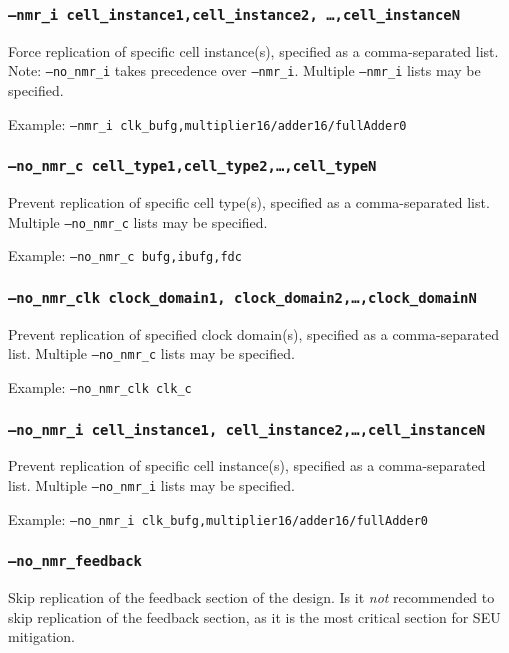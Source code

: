 \subsubsection{\texttt{--nmr\_i cell\_instance1,cell\_instance2,
\ldots,cell\_instanceN}}
Force replication of specific cell instance(s), specified as a comma-separated
list. 
Note: \texttt{--no\_nmr\_i} takes precedence over \texttt{--nmr\_i}. Multiple
\texttt{--nmr\_i} lists may be specified.
 
Example: \texttt{--nmr\_i clk\_bufg,multiplier16/adder16/fullAdder0}

\subsubsection{\texttt{--no\_nmr\_c cell\_type1,cell\_type2,\ldots,cell\_typeN}}
Prevent replication of specific cell type(s), specified as a comma-separated 
list. Multiple \texttt{--no\_nmr\_c} lists may be specified.

Example: \texttt{--no\_nmr\_c bufg,ibufg,fdc}

\subsubsection{\texttt{--no\_nmr\_clk clock\_domain1,
clock\_domain2,\ldots,clock\_domainN}}
Prevent replication of specified clock domain(s), specified as a comma-separated 
list. Multiple \texttt{--no\_nmr\_c} lists may be specified.

Example: \texttt{--no\_nmr\_clk clk\_c}


\subsubsection{\texttt{--no\_nmr\_i cell\_instance1,
cell\_instance2,\ldots,cell\_instanceN}}
Prevent replication of specific cell instance(s), specified as a 
comma-separated list. Multiple \texttt{--no\_nmr\_i} lists may be
specified.

Example: \texttt{--no\_nmr\_i clk\_bufg,multiplier16/adder16/fullAdder0}

\subsubsection{\texttt{--no\_nmr\_feedback}}
Skip replication of the feedback section of the design. 
Is it \emph{not} recommended to skip replication of the feedback section, as 
it is the most critical section for SEU mitigation.

